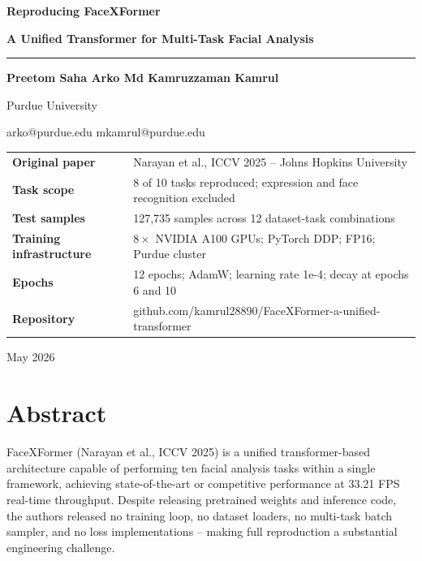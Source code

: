 \documentclass[11pt]{article}
\newenvironment{keybox}[1]{\begin{tcolorbox}[colback=facexlight,colframe=facexteal,title=#1,fonttitle=\bfseries,arc=1mm,boxrule=0.5pt]}{\end{tcolorbox}}
\begin{document}
\hypersetup{pageanchor=false}
\begin{titlepage}
\centering
\vspace*{1.0in}
{\Huge\bfseries\color{facexblue} Reproducing FaceXFormer\par}
\vspace{0.25in}
{\LARGE\bfseries\color{facexteal} A Unified Transformer for Multi-Task Facial Analysis\par}
\vspace{0.35in}
\rule{0.78\textwidth}{1.2pt}
\vspace{0.4in}

{\Large\bfseries Preetom Saha Arko \quad Md Kamruzzaman Kamrul\par}
\vspace{0.1in}
{\large Purdue University\par}
\vspace{0.1in}
{\normalsize arko@purdue.edu \quad mkamrul@purdue.edu\par}
\vfill

\begin{keybox}{Report Scope}
\begin{tabularx}{0.92\textwidth}{>{\bfseries}p{}Y}
Original paper & Narayan et al., ICCV 2025 -- Johns Hopkins University\\
Task scope & 8 of 10 tasks reproduced; expression and face recognition excluded\\
Test samples & 127,735 samples across 12 dataset-task combinations\\
Training infrastructure & $8\times$ NVIDIA A100 GPUs; PyTorch DDP; FP16; Purdue cluster\\
Epochs & 12 epochs; AdamW; learning rate 1e-4; decay at epochs 6 and 10\\
Repository & github.com/kamrul28890/FaceXFormer-a-unified-transformer\\
\end{tabularx}
\end{keybox}
\vfill
{\large May 2026\par}
\end{titlepage}
\hypersetup{pageanchor=true}

\tableofcontents
\newpage
{}


\section*{Abstract}

FaceXFormer (Narayan et al., ICCV 2025) is a unified transformer-based architecture capable of performing ten facial analysis tasks within a single framework, achieving state-of-the-art or competitive performance at 33.21 FPS real-time throughput. Despite releasing pretrained weights and inference code, the authors released no training loop, no dataset loaders, no multi-task batch sampler, and no loss implementations -- making full reproduction a substantial engineering challenge.
\end{document}
